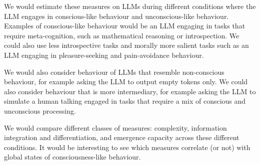 \documentclass[11pt,a4paper]{article}
\begin{document}
We would estimate these measures on LLMs during different conditions where the LLM engages in conscious-like behaviour and unconscious-like behaviour. Examples of conscious-like behaviour would be an LLM engaging in tasks that require meta-cognition, such as mathematical reasoning or introspection. We could also use less introspective tasks and morally more salient tasks such as an LLM engaging in pleasure-seeking and pain-avoidance behaviour.

We would also consider behaviour of LLMs that resemble non-conscious behaviour, for example asking the LLM to output empty tokens only. We could also consider behaviour that is more intermediary, for example asking the LLM to simulate a human talking engaged in tasks that require a mix of conscious and unconscious processing.

We would compare different classes of measures: complexity, information integration and differentiation, and emergence capacity across these different conditions. It would be interesting to see which measures correlate (or not) with global states of consciousness-like behaviour.

\end{document}
